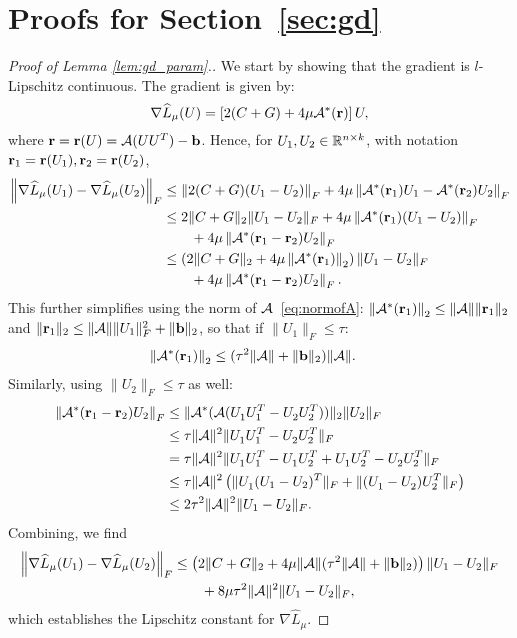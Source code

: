 \section{Proofs for Section~\ref{sec:gd}}\label{apdx:gd}

\begin{proof}[Proof of Lemma \ref{lem:gd_param}.]
We start by showing that the gradient is $l$-Lipschitz continuous. The gradient is given by:
   $$\nabla {\widehat L_\mu}(U) = \left[2(C+G) + 4\mu\mathcal{A}^*(\mathbf{r})\right]U,$$
   where $\mathbf{r} = \mathbf{r}(U) = \mathcal{A}(UU^T) - \mathbf{b}$. Hence, for $U_1, U_2 \in \mathbb{R}^{n\times k}$, with notation $\mathbf{r}_1 = \mathbf{r}(U_1), \mathbf{r}_2 = \mathbf{r}(U_2)$,
  \begin{align*}
  \left\lVert{ \nabla {\widehat L_\mu}(U_1) -\nabla {\widehat L_\mu}(U_2)}\right\rVert_F
  & \leq \left\lVert{ 2(C+G)(U_1-U_2)}\right\rVert_F + 4\mu \left\lVert{\mathcal{A}^*(\mathbf{r}_1)U_1 - \mathcal{A}^*(\mathbf{r}_2)U_2  }\right\rVert_F \\
  & \leq 2\|C+G\|_2 \| U_1 -U_2\|_F + 4 \mu \left\lVert{\mathcal{A}^*(\mathbf{r}_1) (U_1- U_2)  }\right\rVert_F \\
  & \quad \quad + 4 \mu \left\lVert{\mathcal{A}^*(\mathbf{r}_1 - \mathbf{r}_2) U_2}\right\rVert_F \\ 
  & \leq \left(2\|C+G\|_2 + 4 \mu \left\| \mathcal{A}^*(\mathbf{r}_1) \right\|_2 \right) \| U_1 -U_2\|_F	\\
  & \quad \quad + 4 \mu \left\lVert{\mathcal{A}^*(\mathbf{r}_1 - \mathbf{r}_2) U_2}\right\rVert_F.
  \end{align*} 
 This further simplifies using the norm of $\mathcal{A}$~\eqref{eq:normofA}: $\left\| \mathcal{A}^*(\mathbf{r}_1) \right\|_2 \leq \|\mathcal{A}\| \|\mathbf{r}_1\|_2$ and $\|\mathbf{r}_1\|_2 \leq \|\mathcal{A}\| \|U_1\|_F^2 + \|\mathbf{b}\|_2$, so that if $\|U_1\|_F \leq \tau$:
 \begin{align*}
 \left\| \mathcal{A}^*(\mathbf{r}_1) \right\|_2 & \leq (\tau^2\|\mathcal{A}\|+\|\mathbf{b}\|_2)\|\mathcal{A}\|.
 \end{align*}
 Similarly, using $\|U_2\|_F \leq \tau$ as well:
 \begin{align}
\left\lVert{\mathcal{A}^*(\mathbf{r}_1 - \mathbf{r}_2) U_2}\right\rVert_F & \leq \|\mathcal{A}^*(\mathcal{A}(U_1^{}U_1^T - U_2^{}U_2^T))\|_2 \|U_2\|_F\nonumber\\
& \leq \tau \|\mathcal{A}\|^2 \|U_1^{}U_1^T - U_2^{}U_2^T\|_F \nonumber\\
& = \tau \|\mathcal{A}\|^2 \|U_1^{}U_1^T - U_1^{}U_2^T + U_1^{}U_2^T - U_2^{}U_2^T\|_F \nonumber\\
& \leq \tau \|\mathcal{A}\|^2 \left( \|U_1^{}(U_1 - U_2)^T \|_F + \|(U_1^{} - U_2^{})U_2^T\|_F \right) \nonumber\\
& \leq 2\tau^2 \|\mathcal{A}\|^2 \|U_1 - U_2\|_F. \label{eq:Astarr1r2}
\end{align}
Combining, we find
\begin{align*}
\left\lVert{ \nabla {\widehat L_\mu}(U_1) -\nabla {\widehat L_\mu}(U_2)}\right\rVert_F
& \leq \left(2\|C+G\|_2 + 4 \mu \|\mathcal{A}\| (\tau^2\|\mathcal{A}\|+\|\mathbf{b}\|_2) \right) \| U_1 -U_2\|_F	\\
& \quad \quad + 8 \mu \tau^2 \|\mathcal{A}\|^2 \|U_1 - U_2\|_F,
\end{align*}
which establishes the Lipschitz constant for $\nabla {\widehat L_\mu}$.


\end{proof}
